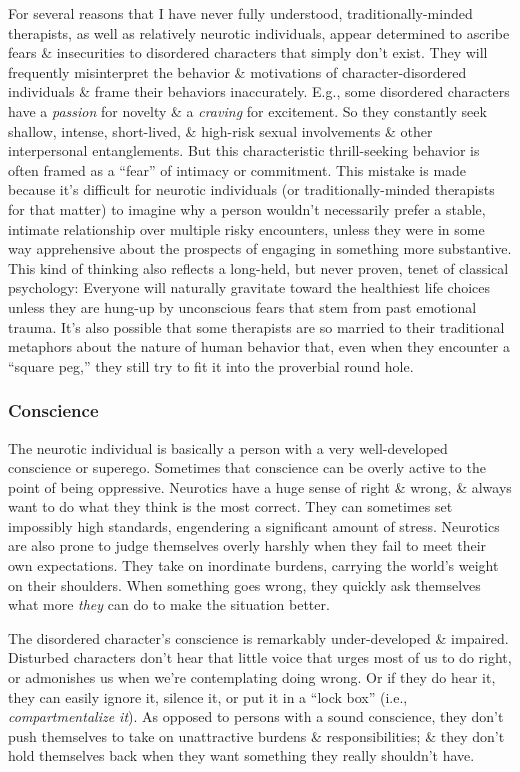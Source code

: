 \documentclass{article}
\numberwithin{equation}{section}
\begin{document}
For several reasons that I have never fully understood, traditionally-minded therapists, as well as relatively neurotic individuals, appear determined to ascribe fears \& insecurities to disordered characters that simply don't exist. They will frequently misinterpret the behavior \& motivations of character-disordered individuals \& frame their behaviors inaccurately. E.g., some disordered characters have a \textit{passion} for novelty \& a \textit{craving} for excitement. So they constantly seek shallow, intense, short-lived, \& high-risk sexual involvements \& other interpersonal entanglements. But this characteristic thrill-seeking behavior is often framed as a ``fear'' of intimacy or commitment. This mistake is made because it's difficult for neurotic individuals (or traditionally-minded therapists for that matter) to imagine why a person wouldn't necessarily prefer a stable, intimate relationship over multiple risky encounters, unless they were in some way apprehensive about the prospects of engaging in something more substantive. This kind of thinking also reflects a long-held, but never proven, tenet of classical psychology: Everyone will naturally gravitate toward the healthiest life choices unless they are hung-up by unconscious fears that stem from past emotional trauma. It's also possible that some therapists are so married to their traditional metaphors about the nature of human behavior that, even when they encounter a ``square peg,'' they still try to fit it into the proverbial round hole.

\subsubsection{Conscience}
The neurotic individual is basically a person with a very well-developed conscience or superego. Sometimes that conscience can be overly active to the point of being oppressive. Neurotics have a huge sense of right \& wrong, \& always want to do what they think is the most correct. They can sometimes set impossibly high standards, engendering a significant amount of stress. Neurotics are also prone to judge themselves overly harshly when they fail to meet their own expectations. They take on inordinate burdens, carrying the world's weight on their shoulders. When something goes wrong, they quickly ask themselves what more  \textit{they} can do to make the situation better.
	

The disordered character's conscience is remarkably under-developed \& impaired. Disturbed characters don't hear that little voice that urges most of us to do right, or admonishes us when we're contemplating doing wrong. Or if they do hear it, they can easily ignore it, silence it, or put it in a ``lock box'' (i.e., \textit{compartmentalize it}). As opposed to persons with a sound conscience, they don't push themselves to take on unattractive burdens \& responsibilities; \& they don't hold themselves back when they want something they really shouldn't have.
\end{document}
